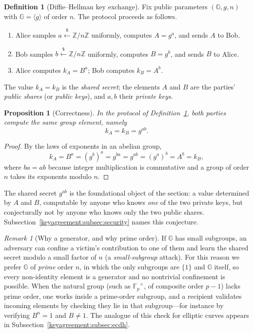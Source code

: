 \documentclass[11pt,a4paper]{article}
\newtheorem{proposition}[theorem]{Proposition}
\theoremstyle{definition}
\newtheorem{definition}[theorem]{Definition}
\theoremstyle{remark}
\newtheorem{remark}[theorem]{Remark}
\newcommand{\Z}{\ensuremath{\mathbb{Z}}}
\newcommand{\G}{\ensuremath{\mathbb{G}}}
\newcommand{\Fp}{\ensuremath{\mathbb{F}_{p}}}
\begin{document}
\begin{definition}[Diffie--Hellman key exchange]\label{keyagreement:def:dhke}
Fix public parameters \((\G, g, n)\) with \(\G = \langle g\rangle\) of order \(n\). The protocol proceeds as follows.
\begin{enumerate}
  \item Alice samples \(a \xleftarrow{\$} \Z/n\Z\) uniformly, computes \(A = g^a\), and sends \(A\) to Bob.
  \item Bob samples \(b \xleftarrow{\$} \Z/n\Z\) uniformly, computes \(B = g^b\), and sends \(B\) to Alice.
  \item Alice computes \(k_A = B^a\); Bob computes \(k_B = A^b\).
\end{enumerate}
The value \(k_A = k_B\) is the \emph{shared secret}; the elements \(A\) and \(B\) are the parties' \emph{public shares} (or \emph{public keys}), and \(a, b\) their \emph{private keys}.
\end{definition}

\begin{proposition}[Correctness]\label{keyagreement:prop:dh-correct}
In the protocol of Definition~\ref{keyagreement:def:dhke}, both parties compute the same group element, namely
\[
  k_A = k_B = g^{ab}.
\]
\end{proposition}

\begin{proof}
By the laws of exponents in an abelian group,
\[
  k_A = B^a = (g^b)^a = g^{ba} = g^{ab} = (g^a)^b = A^b = k_B,
\]
where \(ba = ab\) because integer multiplication is commutative and a group of order \(n\) takes its exponents modulo \(n\).
\end{proof}

The shared secret \(g^{ab}\) is the foundational object of the section: a value determined by \(A\) and \(B\), computable by anyone who knows \emph{one} of the two private keys, but conjecturally not by anyone who knows only the two public shares. Subsection~\ref{keyagreement:subsec:security} names this conjecture.

\begin{remark}[Why a generator, and why prime order]\label{keyagreement:rem:primeorder}
If \(\G\) has small subgroups, an adversary can confine a victim's contribution to one of them and learn the shared secret modulo a small factor of \(n\) (a \emph{small-subgroup} attack). For this reason we prefer \(\G\) of \emph{prime} order \(n\), in which the only subgroups are \(\{1\}\) and \(\G\) itself, so every non-identity element is a generator and no nontrivial confinement is possible. When the natural group (such as \(\Fp^\times\), of composite order \(p-1\)) lacks prime order, one works inside a prime-order subgroup, and a recipient validates incoming elements by checking they lie in that subgroup---for instance by verifying \(B^n = 1\) and \(B \neq 1\). The analogue of this check for elliptic curves appears in Subsection~\ref{keyagreement:subsec:ecdh}.
\end{remark}
\end{document}
